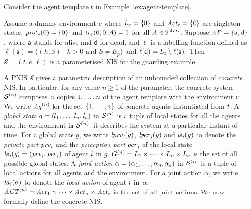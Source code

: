 \begin{example}
  \label{ex:pnis}
  Consider the agent template $t$ in Example~\ref{ex:agent-template}.

  Assume a dummy environment $e$ where $L_{e}= \{0\}$ and
  $\mathit{Act}_{e}=\{0\}$ are singleton states, $\mathit{prot}_{e}(0) = \{0\}$ and
  $\mathit{tr}_{e}(0,0,A) = 0$ for all $A\in 2^{\mathit{Act}_{t}}$.
  Suppose $\it{AP} = \{\mathsf{a}, \mathsf{d}\}$, where $\mathsf{a}$ stands for
  alive and $\mathsf{d}$ for dead, and $\ell$ is a labelling function defined
  as $\ell(\mathsf{a}) = \{(h,S) \mid h > 0 \text{ and }S \neq E_p\}$ and
  $\ell(\mathsf{d}) = L_{t} \setminus \ell(\mathsf{a})$.
%
  Then $\mathcal{S} = (t,e,\ell)$ is a parameterised NIS for the guarding example.
\end{example}

A PNIS $\mathcal S$ gives a parametric description of an unbounded collection
of {\em concrete} NIS. In particular, for any value $n \geq 1$ of the parameter, 
the concrete system $\mathcal{S}^{(n)}$ composes~$n$ copies ${1}, \ldots, {n}$ of the
agent template with the environment ${e}$. We write $\mathit{Ag}^{(n)}$ for the set
$\left \{ {1}, \ldots, {n} \right \}$ of concrete agents instantiated from
${t}$.
%
A \emph{global state} $q = \left ( l_{1}, \ldots, l_{n}, l_{e} \right )$ in
$\mathcal{S}^{(n)}$ is a tuple of local states for all the agents and the environment in
$\mathcal{S}^{(n)}$; it describes the system at a particular instant of time.  For a
global state $g$, we write $\it{lprv}_{i}(g)$, $\it{lper}_{i}(g)$ and $\it{ls}_{i}(g)$ to
denote the \emph{private part} $\mathit{prv}_{i}$ and the \emph{perception part} $\mathit{per}_{i}$
of the local state $\it{ls}_{i}(g) = \left ( \mathit{prv}_{i}, \mathit{per}_{i} \right )$ of agent ${i}$ in
$g$.  $G^{(n)}=L_{1}\times\dots\times L_{n}\times L_e$ is
the set of all possible global states.
% 
A \emph{joint action} $\alpha = \left ( \alpha_1, \ldots, \alpha_n, \alpha_e \right )$
in $\mathcal{S}^{(n)}$ is a tuple of local actions for all agents and the environment.
For a joint action $\alpha$, we write $\it{la}_{i}({\alpha})$ to denote the
\emph{local action} of agent ${i}$ in~$\alpha$.  
$\mathit{ACT}^{(n)} = \mathit{Act}_{1}\times\dots\times\mathit{Act}_{n}\times\mathit{Act}_{e}$ is the set of all
joint actions.
We now formally define the concrete NIS.



